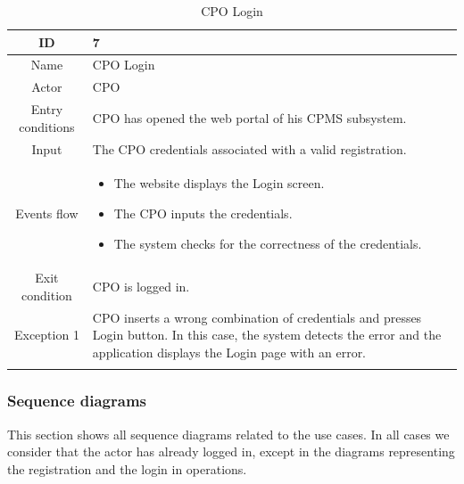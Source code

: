 \begin{longtable}{|c| p{10cm}|}
    \hline ID        & 7\\
    \hline
    Name     & CPO Login \\
    \hline
    Actor            & CPO\\
    \hline 
    Entry conditions & CPO has opened the web portal of his CPMS subsystem.
        \\
    \hline
    Input & The CPO credentials associated with a valid registration.
    \\
    \hline
    Events flow      & \begin{itemize}[nosep,after=\strut]
        \item The website displays the Login screen.
        \item The CPO inputs the credentials.
        \item The system checks for the correctness of the credentials.
        \end{itemize} \\
    \hline
    Exit condition   & CPO is logged in.
    \\
    \hline
    Exception 1      & CPO inserts a wrong combination of credentials and presses Login button. In this case, the system detects the error and the application displays the Login page with an error. \\
    \hline
    \caption{CPO Login}\\
\end{longtable}
\subsubsection{Sequence diagrams}
This section shows all sequence diagrams related to the use cases. In all cases we consider that the actor has already logged in, except in the diagrams representing the registration and the login in operations.

